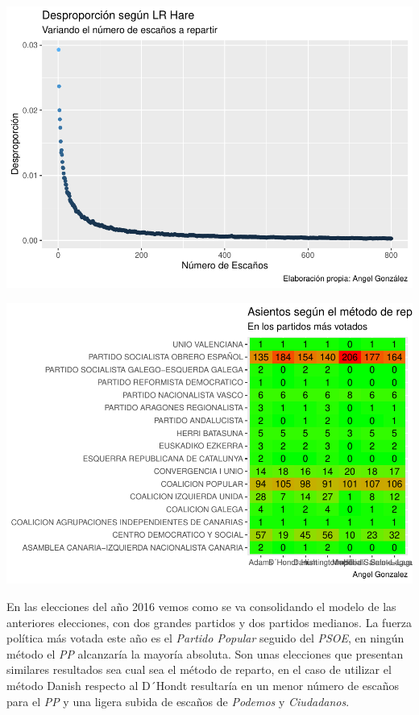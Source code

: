 \documentclass[12pt,a4paper,]{book}
\numberwithin{dummy}{section}
\theoremstyle{ocrenumbox}
\theoremstyle{blacknumex}
\theoremstyle{blacknumbox}
\theoremstyle{ocrenum}
\theoremstyle{ocrenum}
\begin{document}
\begin{center}\includegraphics[width=1\linewidth]{figurasR/unnamed-chunk-41-1} \end{center}

\begin{center}\includegraphics[width=1\linewidth]{figurasR/unnamed-chunk-41-2} \end{center}

En las elecciones del año 2016 vemos como se va consolidando el modelo
de las anteriores elecciones, con dos grandes partidos y dos partidos
medianos. La fuerza política más votada este año es el \emph{Partido
Popular} seguido del \emph{PSOE}, en ningún método el \emph{PP}
alcanzaría la mayoría absoluta. Son unas elecciones que presentan
similares resultados sea cual sea el método de reparto, en el caso de
utilizar el método Danish respecto al D´Hondt resultaría en un menor
número de escaños para el \emph{PP} y una ligera subida de escaños de
\emph{Podemos} y \emph{Ciudadanos}.
\end{document}
